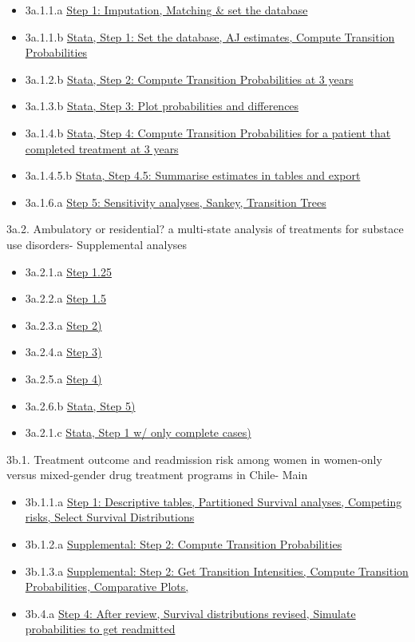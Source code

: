 \documentclass[
]{article}
\begin{document}
\begin{itemize}
\item
  3a.1.1.a \href{Matching_Process1_APR_22}{Step 1: Imputation, Matching
  \& set the database}
\item
  3a.1.1.b \href{Matching_Process1_stata_APR_22}{Stata, Step 1: Set the
  database, AJ estimates, Compute Transition Probabilities}
\item
  3a.1.2.b \href{Matching_Process2_stata_APR_22}{Stata, Step 2: Compute
  Transition Probabilities at 3 years}
\item
  3a.1.3.b \href{Matching_Process3_stata_APR_22}{Stata, Step 3: Plot
  probabilities and differences}
\item
  3a.1.4.b \href{Matching_Process4_stata_APR_22}{Stata, Step 4: Compute
  Transition Probabilities for a patient that completed treatment at 3
  years}
\item
  3a.1.4.5.b \href{Matching_Process4_5_stata_APR_22}{Stata, Step 4.5:
  Summarise estimates in tables and export}
\item
  3a.1.6.a \href{Matching_Process5_APR_22}{Step 5: Sensitivity analyses,
  Sankey, Transition Trees}
\end{itemize}

3a.2. Ambulatory or residential? a multi-state analysis of treatments
for substace use disorders- Supplemental analyses

\begin{itemize}
\item
  3a.2.1.a \href{Matching_Process1_25_APR_22}{Step 1.25}
\item
  3a.2.2.a \href{Matching_Process15_APR_22}{Step 1.5}
\item
  3a.2.3.a \href{Matching_Process2_APR_22}{Step 2)}
\item
  3a.2.4.a \href{Matching_Process3_APR_22}{Step 3)}
\item
  3a.2.5.a \href{Matching_Process4_APR_22}{Step 4)}
\item
  3a.2.6.b \href{Matching_Process5_stata_APR_22}{Stata, Step 5)}
\item
  3a.2.1.c \href{Matching_Process1_stata_APR_22_cc}{Stata, Step 1 w/
  only complete cases)}
\end{itemize}

3b.1. Treatment outcome and readmission risk among women in women-only
versus mixed-gender drug treatment programs in Chile- Main

\begin{itemize}
\item
  3b.1.1.a \href{Proyecto_carla3}{Step 1: Descriptive tables,
  Partitioned Survival analyses, Competing risks, Select Survival
  Distributions}
\item
  3b.1.2.a \href{Proyecto_carla32}{Supplemental: Step 2: Compute
  Transition Probabilities}
\item
  3b.1.3.a \href{Proyecto_carla33}{Supplemental: Step 2: Get Transition
  Intensities, Compute Transition Probabilities, Comparative Plots,}
\item
  3b.4.a \href{Proyecto_carla34}{Step 4: After review, Survival
  distributions revised, Simulate probabilities to get readmitted}
\end{itemize}
\end{document}
